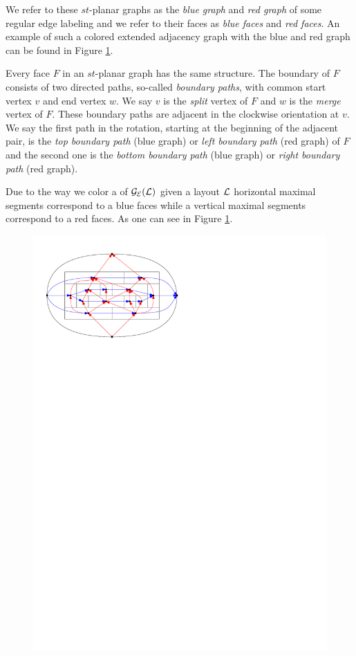     We refer to these $st$-planar graphs as the \emph{blue graph} and \emph{red graph} of some regular edge labeling and we refer to their faces as \emph{blue faces} and \emph{red faces}. An example of such a colored extended adjacency graph with the blue and red graph can be found in Figure \ref{fig:rect:relSegmentFace}.

    Every face $F$ in an $st$-planar graph has the same structure. The boundary of $F$ consists of two directed paths, so-called \emph{boundary paths}, with common start vertex $v$ and end vertex $w$. We say $v$ is the \emph{split} vertex of $F$ and $w$ is the \emph{merge} vertex of $F$.
    These boundary paths are adjacent in the clockwise orientation at $v$. We say the first path in the rotation, starting at the beginning of the adjacent pair, is the \emph{top boundary path} (blue graph) or \emph{left boundary path} (red graph) of $F$ and the second one is the \emph{bottom boundary path} (blue graph) or \emph{right boundary path} (red graph).


    Due to the way we color a \rel of $\mathcal{G}_{\mathcal{E}}(\mathcal{L})$ given a layout $\mathcal{L}$ horizontal maximal segments correspond to a blue faces while a vertical maximal segments correspond to a red faces. As one can see in Figure \ref{fig:rect:relSegmentFace}.

    \begin{figure}[h]
      \centering
      \includegraphics[scale=1]{rectangularDuals/img/relSegmentFaceRescale}
      \caption{}
      \label{fig:rect:relSegmentFace}
    \end{figure}


